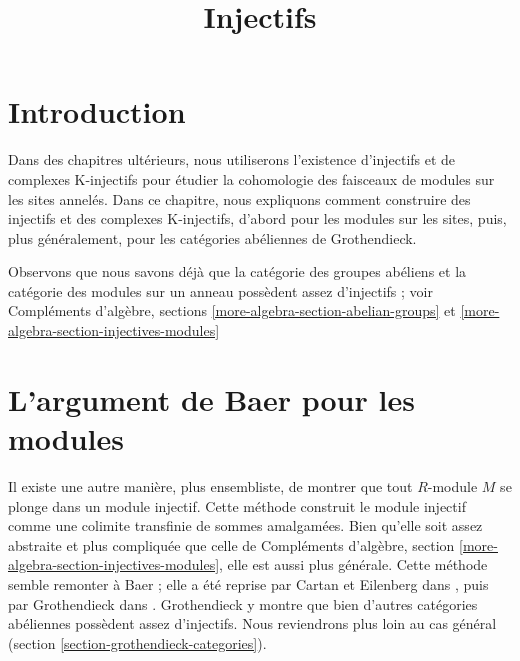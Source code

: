 

%


\title{Injectifs}


\maketitle

\label{section-phantom}

\tableofcontents

\section{Introduction}
\label{section-introduction}

\noindent
Dans des chapitres ultérieurs, nous utiliserons l'existence d'injectifs et
de complexes K-injectifs pour étudier la cohomologie des faisceaux de modules
sur les sites annelés. Dans ce chapitre, nous expliquons comment construire
des injectifs et des complexes K-injectifs, d'abord pour les modules sur les
sites, puis, plus généralement, pour les catégories abéliennes de Grothendieck.

\medskip\noindent
Observons que nous savons déjà que la catégorie des groupes abéliens et la
catégorie des modules sur un anneau possèdent assez d'injectifs ; voir
Compléments d'algèbre, sections
\ref{more-algebra-section-abelian-groups} et
\ref{more-algebra-section-injectives-modules}





\section{L'argument de Baer pour les modules}
\label{section-baer}

\noindent
Il existe une autre manière, plus ensembliste, de montrer que tout $R$-module
$M$ se plonge dans un module injectif. Cette méthode construit le module
injectif comme une colimite transfinie de sommes amalgamées. Bien qu'elle soit
assez abstraite et plus compliquée que celle de
Compléments d'algèbre, section \ref{more-algebra-section-injectives-modules},
elle est aussi plus générale. Cette méthode semble remonter à Baer ; elle a
été reprise par Cartan et Eilenberg dans \cite{Cartan-Eilenberg}, puis par
Grothendieck dans \cite{Tohoku}. Grothendieck y montre que bien d'autres
catégories abéliennes possèdent assez d'injectifs. Nous reviendrons plus loin
au cas général (section \ref{section-grothendieck-categories}).

